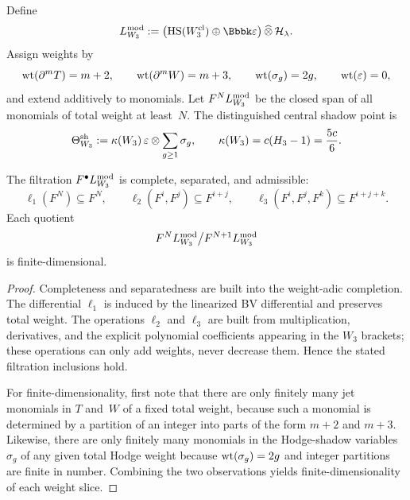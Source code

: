 \begin{definition}
\label{def:weighted-modular-semistrict-envelope-chapter}
Define
\[
L_{W_3}^{\modu}
:=
\bigl(\HS(W_3^{\mathrm{cl}})\oplus \Bbbk\varepsilon\bigr)\,\widehat{\otimes}\,\mathcal H_{\lambda}.
\]
Assign weights by
\[
\operatorname{wt}(\partial^mT)=m+2,
\qquad
\operatorname{wt}(\partial^mW)=m+3,
\qquad
\operatorname{wt}(\sigma_g)=2g,
\qquad
\operatorname{wt}(\varepsilon)=0,
\]
and extend additively to monomials. Let $F^NL_{W_3}^{\mathrm{mod}}$ be the closed span of all monomials of total weight at least~$N$. The distinguished central shadow point is
\[
\Theta_{W_3}^{\mathrm{sh}}:=\kappa(W_3)\,\varepsilon\otimes\sum_{g\ge1}\sigma_g,
\qquad
\kappa(W_3)=c(H_3-1)=\frac{5c}{6}.
\]
\end{definition}

\begin{proposition}
\label{prop:admissibility-finite-slices-chapter}
The filtration $F^{\bullet}L_{W_3}^{\mathrm{mod}}$ is complete, separated, and admissible:
\[
\ell_1(F^N)\subseteq F^N,
\qquad
\ell_2(F^i,F^j)\subseteq F^{i+j},
\qquad
\ell_3(F^i,F^j,F^k)\subseteq F^{i+j+k}.
\]
Each quotient
\[
F^N L_{W_3}^{\mathrm{mod}}\big/ F^{N+1}L_{W_3}^{\mathrm{mod}}
\]
is finite-dimensional.
\end{proposition}

\begin{proof}
Completeness and separatedness are built into the weight-adic completion. The differential $\ell_1$ is induced by the linearized BV differential and preserves total weight. The operations $\ell_2$ and $\ell_3$ are built from multiplication, derivatives, and the explicit polynomial coefficients appearing in the $W_3$ brackets; these operations can only add weights, never decrease them. Hence the stated filtration inclusions hold.

For finite-dimensionality, first note that there are only finitely many jet monomials in $T$ and~$W$ of a fixed total weight, because such a monomial is determined by a partition of an integer into parts of the form $m+2$ and $m+3$. Likewise, there are only finitely many monomials in the Hodge-shadow variables $\sigma_g$ of any given total Hodge weight because $\operatorname{wt}(\sigma_g)=2g$ and integer partitions are finite in number. Combining the two observations yields finite-dimensionality of each weight slice.\qedhere
\end{proof}

